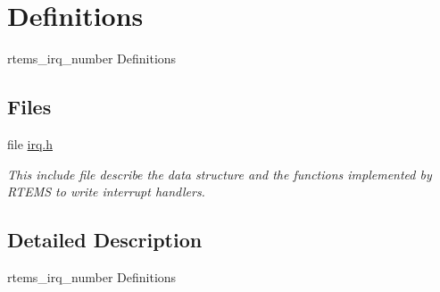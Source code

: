 \hypertarget{group__powerpc__irq}{}\section{Definitions}
\label{group__powerpc__irq}


rtems\+\_\+irq\+\_\+number Definitions  


\subsection*{Files}
\begin{DoxyCompactItemize}
\item 
file \mbox{\hyperlink{bsps_2powerpc_2mvme3100_2include_2bsp_2irq_8h}{irq.\+h}}
\begin{DoxyCompactList}\small\item\em This include file describe the data structure and the functions implemented by R\+T\+E\+MS to write interrupt handlers. \end{DoxyCompactList}\end{DoxyCompactItemize}


\subsection{Detailed Description}
rtems\+\_\+irq\+\_\+number Definitions 

